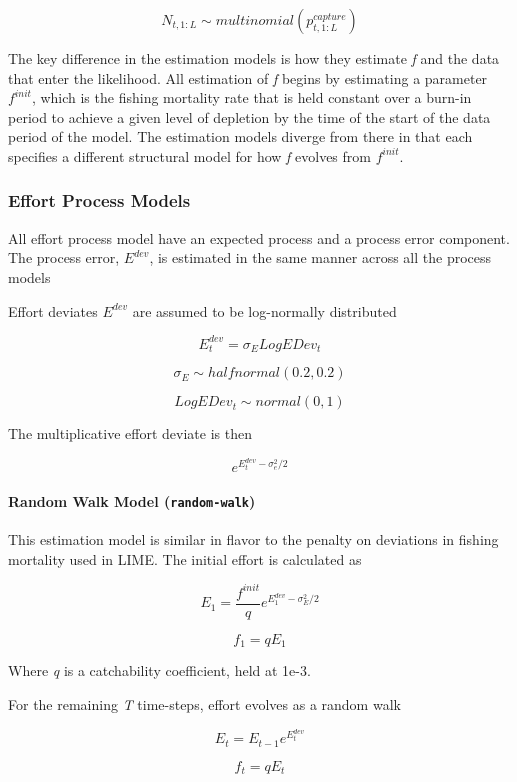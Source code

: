 \documentclass[twoside,12pt,final]{ucthesis-CA2012}
\begin{document}
\begin{ucmainmatter}
\[N_{t,1:L} \sim multinomial(p^{capture}_{t,1:L})\]

The key difference in the estimation models is how they estimate
\emph{f} and the data that enter the likelihood. All estimation of
\emph{f} begins by estimating a parameter \(f^{init}\), which is the
fishing mortality rate that is held constant over a burn-in period to
achieve a given level of depletion by the time of the start of the data
period of the model. The estimation models diverge from there in that
each specifies a different structural model for how \emph{f} evolves
from \(f^{init}\).

\subsubsection{Effort Process Models}\label{effort-process-models}

All effort process model have an expected process and a process error
component. The process error, \(E^{dev}\), is estimated in the same
manner across all the process models

Effort deviates \(E^{dev}\) are assumed to be log-normally distributed

\[E^{dev}_{t} = \sigma_ELogEDev_t\]

\[\sigma_E \sim halfnormal(0.2,0.2)\]

\[LogEDev_t\sim normal(0,1)\]

The multiplicative effort deviate is then

\[e^{E^{dev}_{t} - \sigma_e^2/2} \]

\paragraph{\texorpdfstring{Random Walk Model
(\texttt{random-walk})}{Random Walk Model (random-walk)}}\label{random-walk-model-random-walk}

This estimation model is similar in flavor to the penalty on deviations
in fishing mortality used in LIME. The initial effort is calculated as

\[E_{1} = \frac{f^{init}}{q}e^{E^{dev}_{1}-\sigma_{E}^2/2}\]

\[f_{1} = qE_{1}\]

Where \emph{q} is a catchability coefficient, held at 1e-3.

For the remaining \emph{T} time-steps, effort evolves as a random walk

\[E_{t} = E_{t-1}e^{E^{dev}_{t}}\]

\[f_{t} = qE_{t}\]


\end{ucmainmatter}
\end{document}

